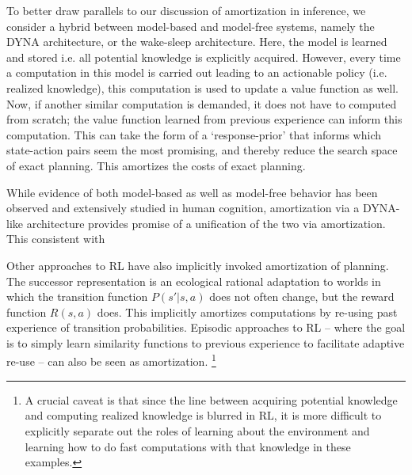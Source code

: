 To better draw parallels to our discussion of amortization in inference, we consider a hybrid between model-based and model-free systems, namely the DYNA architecture, or the wake-sleep architecture. Here, the model is learned and stored i.e. all potential knowledge is explicitly acquired. However, every time a computation in this model is carried out leading to an actionable policy (i.e. realized knowledge), this computation is used to update a value function as well. Now, if another similar computation is demanded, it does not have to computed from scratch; the value function learned from previous experience can inform this computation. This can take the form of a `response-prior' that informs which state-action pairs seem the most promising, and thereby reduce the search space of exact planning. This amortizes the costs of exact planning. 

While evidence of both model-based as well as model-free behavior has been observed and extensively studied in human cognition, amortization via a DYNA-like architecture provides promise of a unification of the two via amortization. This consistent with 

Other approaches to RL have also implicitly invoked amortization of planning. The successor representation is an ecological rational adaptation to worlds in which the transition function $P(s' | s, a)$ does not often change, but the reward function $R(s, a)$ does. This implicitly amortizes computations by re-using past experience of transition probabilities. Episodic approaches to RL -- where the goal is to simply learn similarity functions to previous experience to facilitate adaptive re-use -- can also be seen as amortization. \footnote{A crucial caveat is that since the line between acquiring potential knowledge and computing realized knowledge is blurred in RL, it is more difficult to explicitly separate out the roles of learning about the environment and learning how to do fast computations with that knowledge in these examples.}



